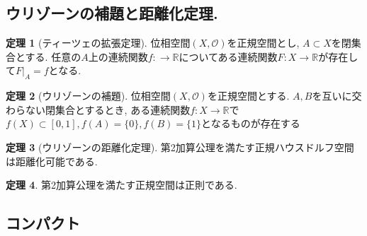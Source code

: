 \documentclass[dvipdfmx,a4paper,11pt]{article}
\newcommand{\R}{\mathbb{R}}
\theoremstyle{definition}
\newtheorem{thm}{定理}
\begin{document}
 \subsection{ウリゾーンの補題と距離化定理.}
  \begin{tcolorbox}[
    colback = white,
    colframe = green!35!black,
    fonttitle = \bfseries,
    breakable = true]
    \begin{thm}[ティーツェの拡張定理]
    位相空間$(X, \mathscr{O})$を正規空間とし, $A \subset X$を閉集合とする.
     任意の$A$上の連続関数$f : \rightarrow \R$についてある連続関数$F : X\rightarrow \R$が存在して$F|_{A} =f$となる.
  \end{thm}
 \end{tcolorbox}

   \begin{tcolorbox}[
    colback = white,
    colframe = green!35!black,
    fonttitle = \bfseries,
    breakable = true]
    \begin{thm}[ウリゾーンの補題]
    位相空間$(X, \mathscr{O})$を正規空間とする.
    $A, B$を互いに交わらない閉集合とするとき, ある連続関数$f : X\rightarrow \R$で$f(X) \subset [0,1], f(A)=\{0\}, f(B)=\{1\}$となるものが存在する
  \end{thm}
 \end{tcolorbox}
 
    \begin{tcolorbox}[
    colback = white,
    colframe = green!35!black,
    fonttitle = \bfseries,
    breakable = true]
    \begin{thm}[ウリゾーンの距離化定理]
第2加算公理を満たす正規ハウスドルフ空間は距離化可能である.
  \end{thm}
 \end{tcolorbox}
 
  
    \begin{tcolorbox}[
    colback = white,
    colframe = green!35!black,
    fonttitle = \bfseries,
    breakable = true]
    \begin{thm}
第2加算公理を満たす正規空間は正則である.
  \end{thm}
 \end{tcolorbox}
 
 \subsection{コンパクト}
 
\end{document}
